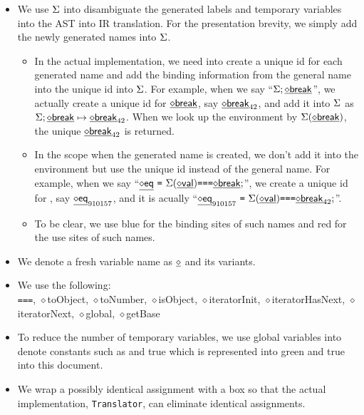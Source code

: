 \begin{itemize}
\item We use $\Sigma$ into disambiguate the generated labels and temporary variables into the AST into IR translation.
For the presentation brevity, we simply add the newly generated names into $\Sigma$.
\begin{itemize}
\item In the actual implementation, we need into create a unique id for each generated name and
add the binding information from the general name into the unique id into $\Sigma$.
For example, when we say ``$\Sigma; \underline{\sf \diamond{break}}$'',
we actually create a unique id for $\underline{\sf \diamond{break}}$, say $\underline{\sf \diamond{break}}_{42}$, and add it into $\Sigma$ as $\Sigma; \underline{\sf \diamond{break}} \mapsto \underline{\sf \diamond{break}}_{42}$.
When we look up the environment by $\Sigma(\underline{\sf \diamond{break}})$, the unique $\underline{\sf \diamond{break}}_{42}$ is returned.
\item In the scope when the generated name is created, we don't add it into the environment but use the unique id instead of the general name.
For example, when we say ``$\newvar{eq}\ \verb+=+\ \env(\newvar{val}) \verb+===+ \newvar{break};$'',
we create a unique id for , say $\underline{\sf \diamond{eq}}_{910157}$, and it is acually
``$\newvar{eq}_{910157}\ \verb+=+\ \env(\newvar{val}) \verb+===+ \newvar{break}_{42};$''.
\item To be clear, we use blue for the binding sites of such names and red for the use sites of such names.
\end{itemize}
\item We denote a fresh variable name as $\underline{\sf \diamond{}}$ and its variants.
\item We use the following:\\
\verb+===+, {\sf \ensuremath{\diamond}toObject}, {\sf \ensuremath{\diamond}toNumber}, {\sf \ensuremath{\diamond}isObject},
{\sf \ensuremath{\diamond}iteratorInit}, {\sf \ensuremath{\diamond}iteratorHasNext}, {\sf \ensuremath{\diamond}iteratorNext},
{\sf \ensuremath{\diamond}global}, {\sf \ensuremath{\diamond}getBase}
\item To reduce the number of temporary variables, we use global variables into denote constants such as {} and
{\sf true} which is represented into green {\ingreen{}} and  {\ingreen\sf true} into this document.
\item We wrap a possibly identical assignment with a box so that the actual implementation, {\tt Translator}, can eliminate identical assignments.
\end{itemize}

